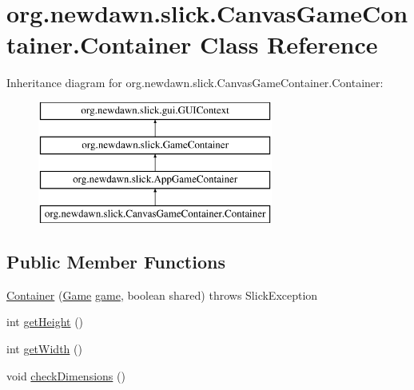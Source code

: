 \hypertarget{classorg_1_1newdawn_1_1slick_1_1_canvas_game_container_1_1_container}{}\section{org.\+newdawn.\+slick.\+Canvas\+Game\+Container.\+Container Class Reference}
\label{classorg_1_1newdawn_1_1slick_1_1_canvas_game_container_1_1_container}
Inheritance diagram for org.\+newdawn.\+slick.\+Canvas\+Game\+Container.\+Container\+:\begin{figure}[H]
\begin{center}
\leavevmode
\includegraphics[height=4.000000cm]{classorg_1_1newdawn_1_1slick_1_1_canvas_game_container_1_1_container}
\end{center}
\end{figure}
\subsection*{Public Member Functions}
\begin{DoxyCompactItemize}
\item 
\mbox{\hyperlink{classorg_1_1newdawn_1_1slick_1_1_canvas_game_container_1_1_container_a3d58909b4612f1251c85e01234d07ac0}{Container}} (\mbox{\hyperlink{interfaceorg_1_1newdawn_1_1slick_1_1_game}{Game}} \mbox{\hyperlink{classorg_1_1newdawn_1_1slick_1_1_game_container_a6a38bb26e45e1c884940caf35c7cfcdc}{game}}, boolean shared)  throws Slick\+Exception 
\item 
int \mbox{\hyperlink{classorg_1_1newdawn_1_1slick_1_1_canvas_game_container_1_1_container_a673c1f67eda4f34499c9c98ed68e6b01}{get\+Height}} ()
\item 
int \mbox{\hyperlink{classorg_1_1newdawn_1_1slick_1_1_canvas_game_container_1_1_container_af5d516263e9340c38d73937f4842de33}{get\+Width}} ()
\item 
void \mbox{\hyperlink{classorg_1_1newdawn_1_1slick_1_1_canvas_game_container_1_1_container_a23325dcc30cb88191ac8f0382a2fc611}{check\+Dimensions}} ()
\end{DoxyCompactItemize}
